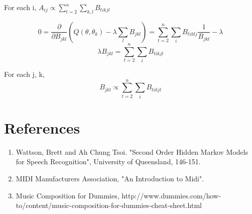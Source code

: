 \documentclass{article} %
\begin{document}
For each i, $A_{ij} \propto \sum_{t=2}^n \sum_{k,l} B_{tikjl}$ \newline

$$ 0 = \frac{\partial}{\partial B_{jkl}} (Q(\theta, \theta_k) - \lambda \sum_l B_{jkl}) = \sum_{t=2}^n \sum_i B_{tiklj} \frac{1}{B_{jkl}} - \lambda$$
$$ \lambda B_{jkl} = \sum_{t=2}^n \sum_i B_{tikjl}$$

For each j, k, \newline
$$B_{jkl} \propto \sum_{t=2}^n \sum_i B_{tikjl}$$

\newpage

\section{References}
\begin{enumerate}
\item Wattson, Brett and Ah Chung Tsoi. "Second Order Hidden Markov Models for Speech Recognition", University of Queensland, 146-151. 
\item MIDI Manufacturers Association, "An Introduction to Midi". 
\item Music Composition for Dummies, http://www.dummies.com/how-to/content/music-composition-for-dummies-cheat-sheet.html
\end{enumerate}
\end{document}
